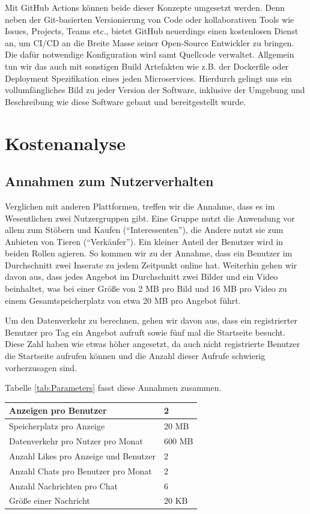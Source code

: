 \documentclass{article}
\begin{document}
Mit GitHub Actions können beide dieser Konzepte umgesetzt werden. Denn neben der Git-basierten Versionierung von Code oder kollaborativen Tools wie Issues, Projects, Teams etc., bietet GitHub neuerdings einen kostenlosen Dienst an, um CI/CD an die Breite Masse seiner Open-Source Entwickler zu bringen. Die dafür notwendige Konfiguration wird samt Quellcode verwaltet. Allgemein tun wir das auch mit sonstigen Build Artefakten wie z.B. der Dockerfile oder Deployment Spezifikation eines jeden Microservices. Hierdurch gelingt uns ein vollumfängliches Bild zu jeder Version der Software, inklusive der Umgebung und Beschreibung wie diese Software gebaut und bereitgestellt wurde. 


\section{Kostenanalyse}


\subsection{Annahmen zum Nutzerverhalten}

Verglichen mit anderen Plattformen, treffen wir die Annahme, dass es im Wesentlichen zwei Nutzergruppen gibt. Eine Gruppe nutzt die Anwendung vor allem zum Stöbern und Kaufen (\enquote{Interessenten}), die Andere nutzt sie zum Anbieten von Tieren (\enquote{Verkäufer}). Ein kleiner Anteil der Benutzer wird in beiden Rollen agieren. So kommen wir zu der Annahme, dass ein Benutzer im Durchschnitt zwei Inserate zu jedem Zeitpunkt online hat. Weiterhin gehen wir davon aus, dass jedes Angebot im Durchschnitt zwei Bilder und ein Video beinhaltet, was bei einer Größe von 2 MB pro Bild und 16 MB pro Video zu einem Gesamtspeicherplatz von etwa 20 MB pro Angebot führt.

Um den Datenverkehr zu berechnen, gehen wir davon aus, dass ein registrierter Benutzer pro Tag ein Angebot aufruft sowie fünf mal die Startseite besucht. Diese Zahl haben wie etwas höher angesetzt, da auch nicht registrierte Benutzer die Startseite aufrufen können und die Anzahl dieser Aufrufe schwierig vorherzusagen sind.

Tabelle \ref{tab:Parameters} fasst diese Annahmen zusammen. 

\begin{center}\label{tab:Parameters}
\begin{tabular}{|l|l|}
    \hline
    Anzeigen pro Benutzer & 2 \\ \hline
    Speicherplatz pro Anzeige & 20 MB \\ \hline
    Datenverkehr pro Nutzer pro Monat & 600 MB \\ \hline
    Anzahl Likes pro Anzeige und Benutzer & 2 \\ \hline
    Anzahl Chats pro Benutzer pro Monat & 2 \\\hline
    Anzahl Nachrichten pro Chat & 6 \\\hline
    Größe einer Nachricht & 20 KB \\ \hline
\end{tabular}    
\end{center}
\end{document}

